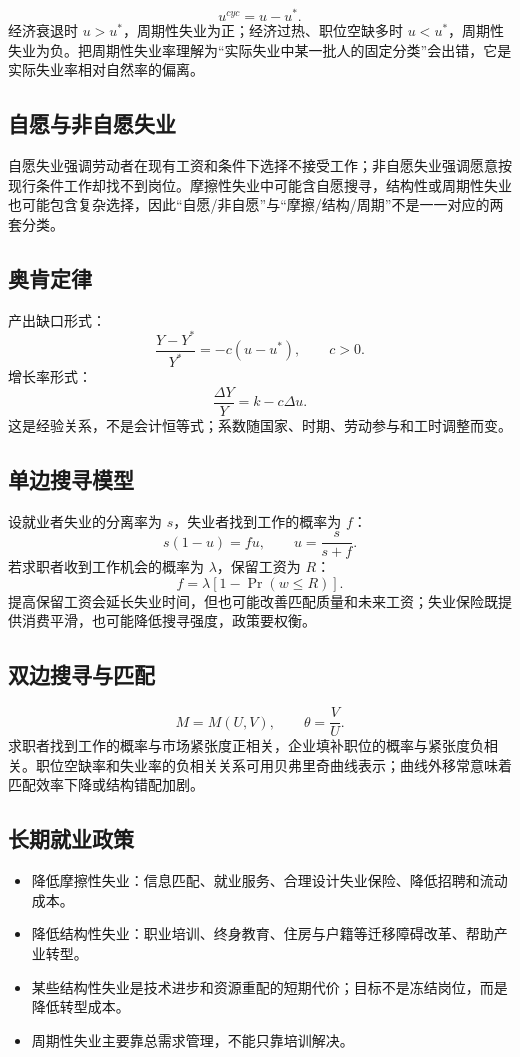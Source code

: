 \documentclass[UTF8,11pt,a4paper]{ctexart}
\begin{document}
\begin{detailbox}[周期性失业率可以为负]
\[
u^{cyc}=u-u^*.
\]
经济衰退时 $u>u^*$，周期性失业为正；经济过热、职位空缺多时 $u<u^*$，周期性失业为负。把周期性失业率理解为“实际失业中某一批人的固定分类”会出错，它是实际失业率相对自然率的偏离。
\end{detailbox}

\subsection{自愿与非自愿失业}
自愿失业强调劳动者在现有工资和条件下选择不接受工作；非自愿失业强调愿意按现行条件工作却找不到岗位。摩擦性失业中可能含自愿搜寻，结构性或周期性失业也可能包含复杂选择，因此“自愿/非自愿”与“摩擦/结构/周期”不是一一对应的两套分类。

\subsection{奥肯定律}
产出缺口形式：
\[
\frac{Y-Y^*}{Y^*}=-c(u-u^*),\qquad c>0.
\]
增长率形式：
\[
\frac{\Delta Y}{Y}=k-c\Delta u.
\]
这是经验关系，不是会计恒等式；系数随国家、时期、劳动参与和工时调整而变。

\subsection{单边搜寻模型}
设就业者失业的分离率为 $s$，失业者找到工作的概率为 $f$：
\[
s(1-u)=fu,
\qquad
u=\frac{s}{s+f}.
\]
若求职者收到工作机会的概率为 $\lambda$，保留工资为 $R$：
\[
f=\lambda[1-\Pr(w\le R)].
\]
提高保留工资会延长失业时间，但也可能改善匹配质量和未来工资；失业保险既提供消费平滑，也可能降低搜寻强度，政策要权衡。

\subsection{双边搜寻与匹配}
\[
M=M(U,V),
\qquad \theta=\frac{V}{U}.
\]
求职者找到工作的概率与市场紧张度正相关，企业填补职位的概率与紧张度负相关。职位空缺率和失业率的负相关关系可用贝弗里奇曲线表示；曲线外移常意味着匹配效率下降或结构错配加剧。

\subsection{长期就业政策}
\begin{itemize}
  \item 降低摩擦性失业：信息匹配、就业服务、合理设计失业保险、降低招聘和流动成本。
  \item 降低结构性失业：职业培训、终身教育、住房与户籍等迁移障碍改革、帮助产业转型。
  \item 某些结构性失业是技术进步和资源重配的短期代价；目标不是冻结岗位，而是降低转型成本。
  \item 周期性失业主要靠总需求管理，不能只靠培训解决。
\end{itemize}
\end{document}
